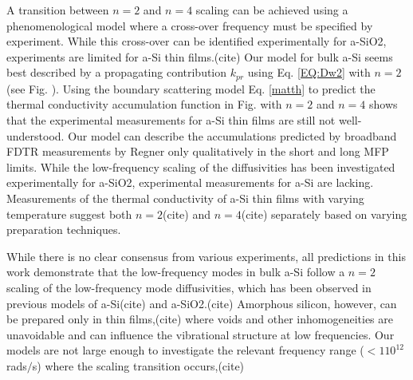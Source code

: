 \documentclass[aps,prb,onecolumn,preprint,superscriptaddress,footinbib,amsmath,amssymb,floatfix]{revtex4}
\begin{document}
A transition between $n=2$ and $n=4$ scaling can be 
achieved using a phenomenological model where a cross-over frequency 
must be specified by experiment.
\cite{baldi_elastic_2011} While this cross-over can be identified 
experimentally for a-SiO2,\cite{masciovecchio_evidence_2006} 
experiments are limited for a-Si thin films.(cite) 
Our model for bulk a-Si seems best described by a propagating 
contribution $k_{pr}$ using Eq. \eqref{EQ:Dw2} with $n=2$ (see Fig. ). 
Using the boundary 
scattering model Eq. \eqref{matth} to  predict the thermal conductivity 
accumulation function in Fig. with $n=2$ and $n=4$ shows that 
the experimental measurements for a-Si thin films are still not 
well-understood. Our model can describe the accumulations predicted 
by broadband FDTR measurements by Regner only qualitatively in the 
short and long MFP limits. 
While the low-frequency scaling of the 
diffusivities has been investigated experimentally for a-SiO2, 
experimental measurements for a-Si are lacking. Measurements 
of the thermal conductivity of a-Si thin films with varying 
temperature suggest both 
$n=2$(cite) and 
$n=4$(cite) 
separately based on varying preparation techniques. 

While there is no clear consensus from various experiments, all 
predictions in this 
work demonstrate that  
the low-frequency modes in bulk a-Si follow a $n=2$ scaling 
of the low-frequency mode diffusivities, 
which has been observed in previous models of a-Si(cite) and 
a-SiO2.(cite)
Amorphous silicon, however, can be
prepared only in thin films,(cite) where voids and other 
inhomogeneities are unavoidable\cite{li_effect_2011} and can influence the 
vibrational structure at low frequencies.
\cite{feldman_tight-binding_2004,liu_high_2009} Our models 
are not large enough to investigate the relevant frequency range 
($< 1 10^{12}$ rads$/$s) where the scaling 
transition occurs,(cite) 


% 
% 
% 
\end{document}
